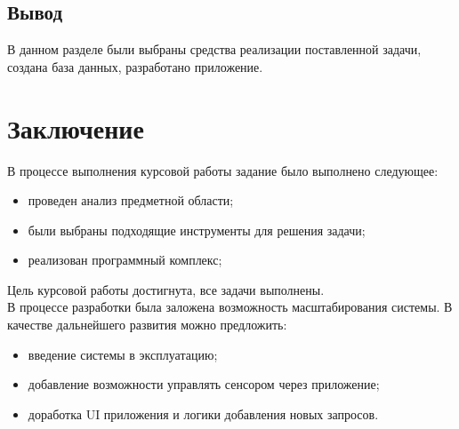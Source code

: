 \subsection{Вывод}
В данном разделе были выбраны средства реализации поставленной задачи, создана база данных, разработано приложение.
\newpage
\section*{Заключение}
В процессе выполнения курсовой работы задание было выполнено следующее:
\begin{itemize}
\item проведен анализ предметной области;
\item были выбраны подходящие инструменты для решения задачи;
\item реализован программный комплекс;

\end{itemize}

\indent Цель курсовой работы достигнута, все задачи выполнены. \\

В процессе разработки была заложена возможность масштабирования системы. В качестве дальнейшего развития можно предложить:
\begin{itemize}
\item введение системы в эксплуатацию;
\item добавление возможности управлять сенсором через приложение;
\item доработка UI приложения и логики добавления новых запросов.
\end{itemize}

